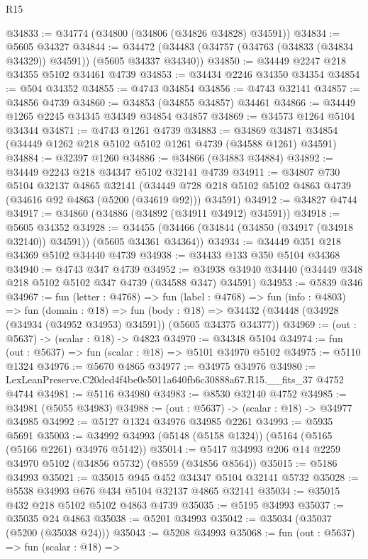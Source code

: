 \begin{lexlean}{R15}
\begin{coremodule}
{{{{{{{{{{{@34833 := @34774 (@34800 (@34806 (@34826 @34828) @34591))
@34834 := @5605 @34327
@34844 := @34472 (@34483 (@34757 (@34763 (@34833 (@34834 @34329)) @34591)) (@5605 @34337 @34340))
@34850 := @34449 @2247 @218 @34355 @5102 @34461 @4739
@34853 := @34434 @2246 @34350 @34354
@34854 := @504 @34352
@34855 := @4743 @34854
@34856 := @4743 @32141
@34857 := @34856 @4739
@34860 := @34853 (@34855 @34857) @34461
@34866 := @34449 @1265 @2245 @34345 @34349 @34854 @34857
@34869 := @34573 @1264 @5104 @34344
@34871 := @4743 @1261 @4739
@34883 := @34869 @34871 @34854 (@34449 @1262 @218 @5102 @5102 @1261 @4739 (@34588 @1261) @34591)
@34884 := @32397 @1260
@34886 := @34866 (@34883 @34884)
@34892 := @34449 @2243 @218 @34347 @5102 @32141 @4739
@34911 := @34807
    @730
    @5104
    @32137
    @4865
    @32141
    (@34449 @728 @218 @5102 @5102 @4863 @4739 (@34616 @92 @4863 (@5200 (@34619 @92))) @34591)
@34912 := @34827 @4744
@34917 := @34860 (@34886 (@34892 (@34911 @34912) @34591))
@34918 := @5605 @34352
@34928 := @34455 (@34466 (@34844 (@34850 (@34917 (@34918 @32140)) @34591)) (@5605 @34361 @34364))
@34934 := @34449 @351 @218 @34369 @5102 @34440 @4739
@34938 := @34433 @133 @350 @5104 @34368
@34940 := @4743 @347 @4739
@34952 := @34938 @34940 @34440 (@34449 @348 @218 @5102 @5102 @347 @4739 (@34588 @347) @34591)
@34953 := @5839 @346
@34967 := fun (letter : @4768) =>
  fun (label : @4768) =>
  fun (info : @4803) =>
  fun (domain : @18) =>
  fun (body : @18) => @34432 (@34448 (@34928 (@34934 (@34952 @34953) @34591)) (@5605 @34375 @34377))
@34969 := (out : @5637) -> (scalar : @18) -> @4823
@34970 := @34348 @5104
@34974 := fun (out : @5637) => fun (scalar : @18) => @5101 @34970 @5102
@34975 := @5110 @1324
@34976 := @5670 @4865
@34977 := @34975 @34976
@34980 := LexLeanPreserve.C20ded4f4be0e5011a640fb6c30888a67.R15.__fits_37 @4752 @4744
@34981 := @5116 @34980
@34983 := @8530 @32140 @4752
@34985 := @34981 (@5055 @34983)
@34988 := (out : @5637) -> (scalar : @18) -> @34977 @34985
@34992 := @5127 @1324 @34976 @34985 @2261
@34993 := @5935 @5691
@35003 := @34992 @34993 (@5148 (@5158 @1324)) (@5164 (@5165 (@5166 @2261) @34976 @5142))
@35014 := @5417 @34993 @206 @14 @2259 @34970 @5102 (@34856 @5732) (@8559 (@34856 @8564))
@35015 := @5186 @34993
@35021 := @35015 @945 @452 @34347 @5104 @32141 @5732
@35028 := @5538 @34993 @676 @434 @5104 @32137 @4865 @32141
@35034 := @35015 @432 @218 @5102 @5102 @4863 @4739
@35035 := @5195 @34993
@35037 := @35035 @24 @4863
@35038 := @5201 @34993
@35042 := @35034 (@35037 (@5200 (@35038 @24)))
@35043 := @5208 @34993
@35068 := fun (out : @5637) =>
  fun (scalar : @18) =>
}}}}}}}}}}}
\end{coremodule}
\end{lexlean}
